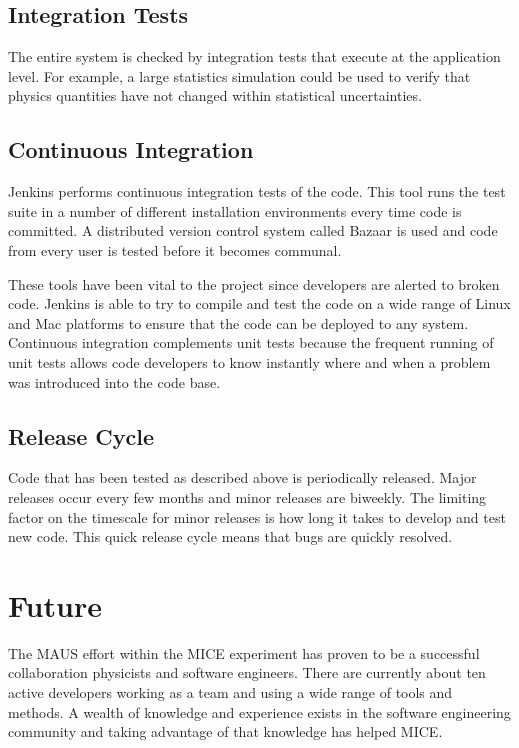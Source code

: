 \documentclass{JAC2003}
\begin{document}
\subsection{Integration Tests}
The entire system is checked by integration tests that execute at the
application level. For example, a large statistics simulation could be
used to verify that physics quantities have not changed within
statistical uncertainties.

\subsection{Continuous Integration}
Jenkins \cite{jenkins} performs continuous integration tests of the code. This tool
runs the test suite in a number of different installation environments
every time code is committed. A distributed version control system
called Bazaar \cite{bzr} is used and code from every user is tested before it
becomes communal.

These tools have been vital to the project since developers are alerted
to broken code. Jenkins is able to try to compile and test the code on a
wide range of Linux and Mac platforms to ensure that the code can be
deployed to any system. Continuous integration complements unit tests
because the frequent running of unit tests allows code developers to  know instantly where and when a problem was introduced into the code base.

\subsection{Release Cycle}

Code that has been tested as described above is periodically released.  Major releases occur every few months and minor releases are biweekly.  The limiting factor on the timescale for minor releases is how long it takes to develop and test new code.  This quick release cycle means that bugs are quickly resolved.


\section{Future}

The MAUS effort within the MICE experiment has proven to be a successful collaboration physicists and software engineers.  There are currently about ten active developers working as a team and using a wide range of tools and methods.   A wealth of knowledge and experience exists in the software engineering community and taking advantage of that knowledge has helped MICE.
\end{document}
